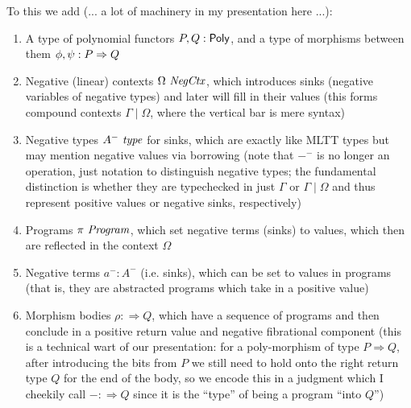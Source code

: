 \documentclass[final]{amsart}
\begin{document}
To this we add (... a lot of machinery in my presentation here ...):
\begin{enumerate}
  \item A type of polynomial functors $P, Q : \mathsf{Poly}$, and a type of morphisms between them $\phi, \psi : P \Rightarrow Q$
  \item Negative (linear) contexts $\Omega\ \mathit{NegCtx}$, which introduces sinks (negative variables of negative types) and later will fill in their values (this forms compound contexts $\Gamma \mid \Omega$, where the vertical bar is mere syntax)
  \item Negative types $A^{-}\, \operatorname{\mathit{type}}$ for sinks, which are exactly like MLTT types but may mention negative values via borrowing (note that ${-}^{-}$ is no longer an operation, just notation to distinguish negative types; the fundamental distinction is whether they are typechecked in just $\Gamma$ or $\Gamma \mid \Omega$ and thus represent positive values or negative sinks, respectively)
  \item Programs $\pi\ \mathit{Program}$, which set negative terms (sinks) to values, which then are reflected in the context $\Omega$
  \item Negative terms $a^{-} : A^{-}$ (i.e. sinks), which can be set to values in programs (that is, they are abstracted programs which take in a positive value)
  \item Morphism bodies $\rho :\Rightarrow Q$, which have a sequence of programs and then conclude in a positive return value and negative fibrational component (this is a technical wart of our presentation: for a poly-morphism of type $P \Rightarrow Q$, after introducing the bits from $P$ we still need to hold onto the right return type $Q$ for the end of the body, so we encode this in a judgment which I cheekily call $- :\Rightarrow Q$ since it is the ``type'' of being a program ``into $Q$'')
\end{enumerate}
\end{document}
